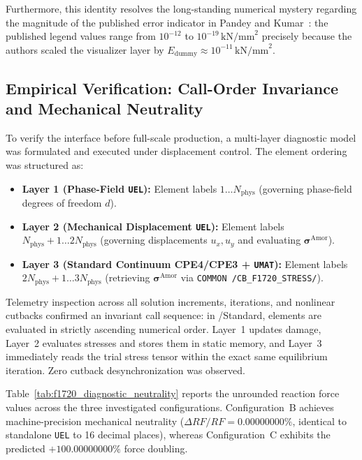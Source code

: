 Furthermore, this identity resolves the long-standing numerical mystery regarding the magnitude of the published error indicator in Pandey and Kumar~\cite[Figure~25(a)]{pandey2025}: the published legend values range from $10^{-12}$ to $10^{-19}\,\mathrm{kN/mm}^2$ precisely because the authors scaled the visualizer layer by $E_{\mathrm{dummy}} \approx 10^{-11}\,\mathrm{kN/mm}^2$.

\subsection{Empirical Verification: Call-Order Invariance and Mechanical Neutrality}
\label{subsec:f1720_call_order}

To verify the interface before full-scale production, a multi-layer diagnostic model was formulated and executed under displacement control. The element ordering was structured as:
\begin{itemize}
  \item \textbf{Layer 1 (Phase-Field \texttt{UEL}):} Element labels $1 \dots N_{\mathrm{phys}}$ (governing phase-field degrees of freedom $d$).
  \item \textbf{Layer 2 (Mechanical Displacement \texttt{UEL}):} Element labels $N_{\mathrm{phys}}+1 \dots 2N_{\mathrm{phys}}$ (governing displacements $u_x, u_y$ and evaluating $\boldsymbol{\sigma}^{\mathrm{Amor}}$).
  \item \textbf{Layer 3 (Standard Continuum CPE4/CPE3 + \texttt{UMAT}):} Element labels $2N_{\mathrm{phys}}+1 \dots 3N_{\mathrm{phys}}$ (retrieving $\boldsymbol{\sigma}^{\mathrm{Amor}}$ via \texttt{COMMON /CB\_F1720\_STRESS/}).
\end{itemize}

Telemetry inspection across all solution increments, iterations, and nonlinear cutbacks confirmed an invariant call sequence: in \Abaqus/Standard, elements are evaluated in strictly ascending numerical order. Layer~1 updates damage, Layer~2 evaluates stresses and stores them in static memory, and Layer~3 immediately reads the trial stress tensor within the exact same equilibrium iteration. Zero cutback desynchronization was observed.

Table~\ref{tab:f1720_diagnostic_neutrality} reports the unrounded reaction force values across the three investigated configurations. Configuration~B achieves machine-precision mechanical neutrality ($\Delta RF / RF = 0.00000000\%$, identical to standalone \texttt{UEL} to 16 decimal places), whereas Configuration~C exhibits the predicted $+100.00000000\%$ force doubling.

